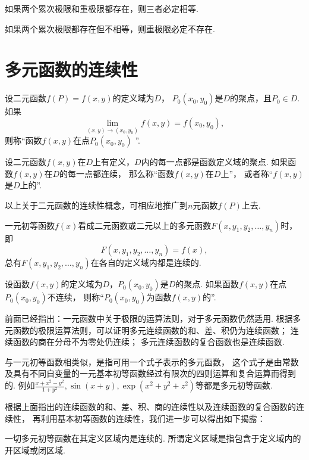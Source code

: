 \begin{corollary}
如果两个累次极限和重极限都存在，则三者必定相等.
\end{corollary}

\begin{corollary}
如果两个累次极限都存在但不相等，则重极限必定不存在.
\end{corollary}

\section{多元函数的连续性}
\begin{definition}
设二元函数\(f(P)=f(x,y)\)的定义域为\(D\)，
\(P_0(x_0,y_0)\)是\(D\)的聚点，且\(P_0 \in D\).
如果\[
	\lim\limits_{(x,y)\to(x_0,y_0)} f(x,y) = f(x_0,y_0),
\]
则称“函数\(f(x,y)\)在点\(P_0(x_0,y_0)\) ”.

设二元函数\(f(x,y)\)在\(D\)上有定义，\(D\)内的每一点都是函数定义域的聚点.
如果函数\(f(x,y)\)在\(D\)的每一点都连续，
那么称“函数\(f(x,y)\)在\(D\)上”，
或者称“\(f(x,y)\)是\(D\)上的”.
\end{definition}
以上关于二元函数的连续性概念，可相应地推广到\(n\)元函数\(f(P)\)上去.

一元初等函数\(f(x)\)看成二元函数或二元以上的多元函数\(F(x,y_1,y_2,\dotsc,y_n)\)时，即\[
	F(x,y_1,y_2,\dotsc,y_n) = f(x),
\]
总有\(F(x,y_1,y_2,\dotsc,y_n)\)在各自的定义域内都是连续的.

\begin{definition}
设函数\(f(x,y)\)的定义域为\(D\)，\(P_0(x_0,y_0)\)是\(D\)的聚点.
如果函数\(f(x,y)\)在点\(P_0(x_0,y_0)\)不连续，
则称“\(P_0(x_0,y_0)\)为函数\(f(x,y)\)的”.
\end{definition}

前面已经指出：一元函数中关于极限的运算法则，对于多元函数仍然适用.
根据多元函数的极限运算法则，可以证明多元连续函数的和、差、积仍为连续函数；
连续函数的商在分母不为零处仍连续；
多元连续函数的复合函数也是连续函数.

与一元初等函数相类似，是指可用一个式子表示的多元函数，
这个式子是由常数及具有不同自变量的一元基本初等函数经过有限次的四则运算和复合运算而得到的.
例如\(\frac{x+x^2-y^2}{1+y^2},\sin(x+y),\exp(x^2+y^2+z^2)\)等都是多元初等函数.

根据上面指出的连续函数的和、差、积、商的连续性以及连续函数的复合函数的连续性，
再利用基本初等函数的连续性，我们进一步可以得出如下揭露：

一切多元初等函数在其定义区域内是连续的.
所谓定义区域是指包含于定义域内的开区域或闭区域.

